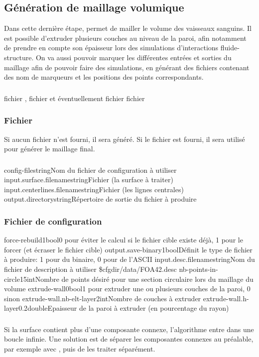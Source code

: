 	\subsection{Génération de maillage volumique}

Dans cette dernière étape,  permet de mailler le volume des vaisseaux sanguins. Il est possible d'extruder plusieurs couches au niveau de la paroi, afin notamment de prendre en compte son épaisseur lors des simulations d'interactions fluide-structure. On va aussi pouvoir marquer les différentes entrées et sorties du maillage afin de pouvoir faire des simulations, en générant des fichiers \desc contenant des nom de marqueurs et les positions des points correspondants.

	\subsubsection{\ioT}
	
\iolist
{fichier \stl, fichier \vtk et éventuellement fichier \desc}
{fichier \msh}

\subsubsection{Fichier \desc}

Si aucun fichier \desc n'est fourni, il sera généré. Si le fichier est fourni, il sera utilisé pour générer le maillage final.
	
	\subsubsection{\argsT}

\args
{config-file}{}{string}{Nom du fichier de configuration à utiliser}
{input.surface.filename}{}{string}{Fichier \stl (la surface à traiter)}
{input.centerlines.filename}{}{string}{Fichier \vtk (les lignes centrales)}
{output.directory}{}{string}{Répertoire de sortie du fichier \stl à produire}
\stoparg

		\subsubsection{Fichier de configuration}

\configfile
{force-rebuild}{1}{bool}{0 pour éviter le calcul si le fichier cible existe déjà, 1 pour le forcer (et écraser le fichier cible)}
{output.save-binary}{1}{bool}{Définit le type de fichier \msh à produire: 1 pour du binaire, 0 pour de l'ASCII}
{input.desc.filename}{}{string}{Nom du fichier de description à utiliser \$cfgdir/data/FOA42.desc}
{nb-points-in-circle}{15}{int}{Nombre de points désiré pour une section circulaire lors du maillage du volume}
{extrude-wall}{0}{bool}{1 pour extruder une ou plusieurs couches de la paroi, 0 sinon}
{extrude-wall.nb-elt-layer}{2}{int}{Nombre de couches à extruder}
{extrude-wall.h-layer}{0.2}{double}{Epaisseur de la paroi à extruder (en pourcentage du rayon)}
\stopfile

	\subsubsection{\etatg}
	
Si la surface contient plus d'une composante connexe, l'algorithme entre dans une boucle infinie. Une solution est de séparer les composantes connexes au préalable, par exemple avec \paraview, puis de les traiter séparément.


